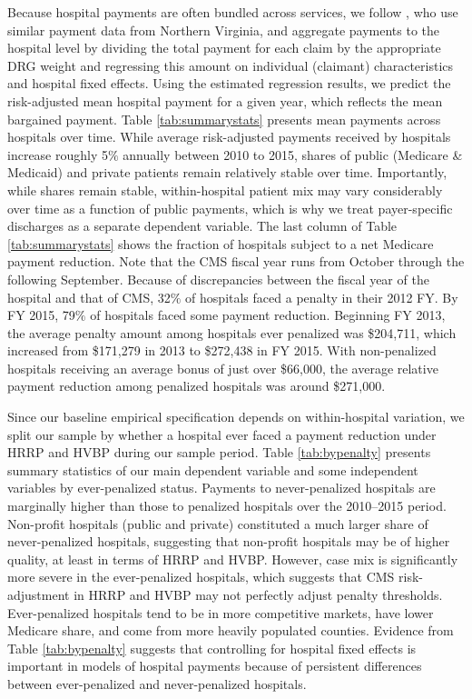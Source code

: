 \documentclass[12pt]{article}
\begin{document}
Because hospital payments are often bundled across services, we follow \citet{gowrisankaran2015}, who use similar payment data from Northern Virginia, and aggregate payments to the hospital level by dividing the total payment for each claim by the appropriate DRG weight and regressing this amount on individual (claimant) characteristics and hospital fixed effects.  Using the estimated regression results, we predict the risk-adjusted mean hospital payment for a given year, which reflects the mean bargained payment. Table \ref{tab:summarystats} presents mean payments across hospitals over time. While average risk-adjusted payments received by hospitals increase roughly 5$\%$ annually between 2010 to 2015, shares of public (Medicare \& Medicaid) and private patients remain relatively stable over time. Importantly, while shares remain stable, within-hospital patient mix may vary considerably over time as a function of public payments, which is why we treat payer-specific discharges as a separate dependent variable. The last column of Table \ref{tab:summarystats} shows the fraction of hospitals subject to a net Medicare payment reduction. Note that the CMS fiscal year runs from October through the following September. Because of discrepancies between the fiscal year of the hospital and that of CMS, 32$\%$ of hospitals faced a penalty in their 2012 FY. By FY 2015, 79$\%$ of hospitals faced some payment reduction. Beginning FY 2013, the average penalty amount among hospitals ever penalized was \$204,711, which increased from \$171,279 in 2013 to \$272,438 in FY 2015. With non-penalized hospitals receiving an average bonus of just over \$66,000, the average relative payment reduction among penalized hospitals was around \$271,000.

Since our baseline empirical specification depends on within-hospital variation, we split our sample by whether a hospital ever faced a payment reduction under HRRP and HVBP during our sample period.  Table \ref{tab:bypenalty} presents summary statistics of our main dependent variable and some independent variables by ever-penalized status.  Payments to never-penalized hospitals are marginally higher than those to penalized hospitals over the 2010--2015 period.  Non-profit hospitals (public and private) constituted a much larger share of never-penalized hospitals, suggesting that non-profit hospitals may be of higher quality, at least in terms of HRRP and HVBP.  However, case mix is significantly more severe in the ever-penalized hospitals, which suggests that CMS risk-adjustment in HRRP and HVBP may not perfectly adjust penalty thresholds.  Ever-penalized hospitals tend to be in more competitive markets, have lower Medicare share, and come from more heavily populated counties.  Evidence from Table \ref{tab:bypenalty} suggests that controlling for hospital fixed effects is important in models of hospital payments because of persistent differences between ever-penalized and never-penalized hospitals.
\end{document}
